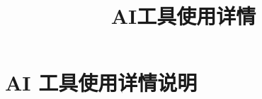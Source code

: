 \documentclass[12pt,a4paper]{article}
\theoremstyle{plain}  %
\theoremstyle{definition}  %
\theoremstyle{remark}  %
\begin{document}
\title{%
    AI工具使用详情
}
\date{}  %
\maketitle


\newpage

\section{AI 工具使用详情说明}


\end{document}
